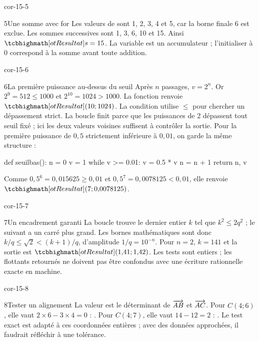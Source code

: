 \begin{blocLivre}{cor-15-5}
\begin{corrige}{5}{Une somme avec for}
Les valeurs de  sont 1, 2, 3, 4 et 5, car la borne finale 6 est exclue. Les sommes successives sont 1, 3, 6, 10 et 15. Ainsi $\res{s=15}$. La variable  est un accumulateur ; l’initialiser à 0 correspond à la somme avant toute addition.
\end{corrige}
\end{blocLivre}
\begin{blocLivre}{cor-15-6}
\begin{corrige}{6}{La première puissance au-dessus du seuil}
Après $n$ passages, $v=2^n$. Or $2^9=512\le1000$ et $2^{10}=1024>1000$. La fonction renvoie $\res{(10;1024)}$. La condition utilise $\le$ pour chercher un dépassement strict. La boucle finit parce que les puissances de 2 dépassent tout seuil fixé ; ici les deux valeurs voisines suffisent à contrôler la sortie. Pour la première puissance de $0{,}5$ strictement inférieure à $0{,}01$, on garde la même structure :
\begin{python}
def seuilbas():
    n = 0
    v = 1
    while v >= 0.01:
        v = 0.5 * v
        n = n + 1
    return n, v
\end{python}
Comme $0{,}5^6=0{,}015625\ge0{,}01$ et $0{,}5^7=0{,}0078125<0{,}01$, elle renvoie $\res{(7;0{,}0078125)}$.
\end{corrige}
\end{blocLivre}
\begin{blocLivre}{cor-15-7}
\begin{corrige}{7}{Un encadrement garanti}
La boucle trouve le dernier entier $k$ tel que $k^2\le2q^2$ ; le suivant a un carré plus grand. Les bornes mathématiques sont donc $k/q\le\sqrt2<(k+1)/q$, d’amplitude $1/q=10^{-n}$. Pour $n=2$, $k=141$ et la sortie est $\res{(1{,}41;1{,}42)}$. Les tests sont entiers ; les flottants retournés ne doivent pas être confondus avec une écriture rationnelle exacte en machine.
\end{corrige}
\end{blocLivre}
\begin{blocLivre}{cor-15-8}
\begin{corrige}{8}{Tester un alignement}
La valeur  est le déterminant de $\overrightarrow{AB}$ et $\overrightarrow{AC}$. Pour $C(4;6)$, elle vaut $2\times6-3\times4=0$ : . Pour $C(4;7)$, elle vaut $14-12=2$ : . Le test exact est adapté à ces coordonnées entières ; avec des données approchées, il faudrait réfléchir à une tolérance.
\end{corrige}
\end{blocLivre}
